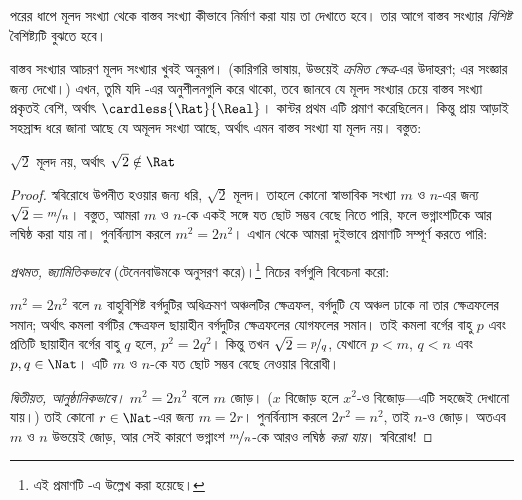 \documentclass[../../../include/open-logic-section]{subfiles}
\begin{document}

পরের ধাপে মূলদ সংখ্যা থেকে বাস্তব সংখ্যা কীভাবে নির্মাণ করা যায় তা দেখাতে হবে। তার আগে বাস্তব সংখ্যার \emph{বিশিষ্ট} বৈশিষ্ট্যটি বুঝতে হবে।

বাস্তব সংখ্যার আচরণ মূলদ সংখ্যার খুবই অনুরূপ। (কারিগরি ভাষায়, উভয়েই \emph{ক্রমিত ক্ষেত্র}-এর উদাহরণ; এর সংজ্ঞার জন্য  দেখো।) এখন, তুমি যদি -এর অনুশীলনগুলি করে থাকো, তবে জানবে যে মূলদ সংখ্যার চেয়ে বাস্তব সংখ্যা প্রকৃতই বেশি, অর্থাৎ $\cardless{\Rat}{\Real}$। কান্টর প্রথম এটি প্রমাণ করেছিলেন। কিন্তু প্রায় আড়াই সহস্রাব্দ ধরে জানা আছে যে অমূলদ সংখ্যা আছে, অর্থাৎ এমন বাস্তব সংখ্যা যা মূলদ নয়। বস্তুত:
\begin{thm}
$\sqrt{2}$ মূলদ নয়, অর্থাৎ $\sqrt{2} \notin \Rat$
\end{thm}

\begin{proof}
স্ববিরোধে উপনীত হওয়ার জন্য ধরি, $\sqrt{2}$ মূলদ। তাহলে কোনো স্বাভাবিক সংখ্যা $m$ ও $n$-এর জন্য $\sqrt{2} =
\nicefrac{m}{n}$। বস্তুত, আমরা $m$ ও $n$-কে একই সঙ্গে যত ছোট সম্ভব বেছে নিতে পারি, ফলে ভগ্নাংশটিকে আর লঘিষ্ঠ করা যায় না। 
পুনর্বিন্যাস করলে $m^{2} = 2n^{2}$। এখান থেকে আমরা দুইভাবে প্রমাণটি সম্পূর্ণ করতে পারি:

\emph{প্রথমত, জ্যামিতিকভাবে} (টেনেনবাউমকে অনুসরণ করে)।\footnote{এই প্রমাণটি \cite{Conway2006}-এ উল্লেখ করা হয়েছে।} নিচের বর্গগুলি বিবেচনা করো:
\begin{center}
\end{center}
$m^2 = 2n^2$ বলে $n$ বাহুবিশিষ্ট বর্গদুটির অধিক্রমণ অঞ্চলটির ক্ষেত্রফল, বর্গদুটি যে অঞ্চল ঢাকে না তার ক্ষেত্রফলের সমান; অর্থাৎ কমলা বর্গটির ক্ষেত্রফল ছায়াহীন বর্গদুটির ক্ষেত্রফলের যোগফলের সমান। তাই কমলা বর্গের বাহু $p$ এবং প্রতিটি ছায়াহীন বর্গের বাহু $q$ হলে, $p^2 = 2q^2$। কিন্তু তখন $\sqrt{2} = \nicefrac{p}{q}$, যেখানে $p < m$, $q < n$ এবং $p, q \in
\Nat$। এটি $m$ ও $n$-কে যত ছোট সম্ভব বেছে নেওয়ার বিরোধী।

\emph{দ্বিতীয়ত, আনুষ্ঠানিকভাবে।} $m^{2} = 2n^{2}$ বলে $m$ জোড়। ($x$ বিজোড় হলে $x^2$-ও বিজোড়—এটি সহজেই দেখানো যায়।) তাই কোনো $r \in \Nat$-এর জন্য $m = 2r$। পুনর্বিন্যাস করলে $2r^2 = n^2$,
তাই $n$-ও জোড়। অতএব $m$ ও $n$ উভয়েই জোড়, আর সেই কারণে ভগ্নাংশ $\nicefrac{m}{n}$-কে আরও লঘিষ্ঠ \emph{করা যায়}। স্ববিরোধ!
\end{proof}
\end{document}
